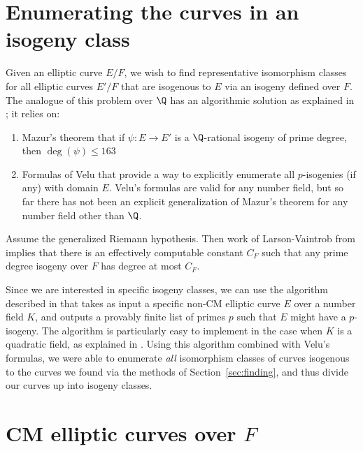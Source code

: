 \documentclass{amsart}
\begin{document}
\section{Enumerating the curves in an isogeny class}\label{sec:isoclass}

Given an elliptic curve $E/F$, we wish to find representative
isomorphism classes for all elliptic curves $E'/F$ that are isogenous
to $E$ via an isogeny defined over $F$. The analogue of this problem
over $\Q$ has an algorithmic solution as explained in
\cite[\S3.8]{cremona:algs}; it relies on:
\begin{enumerate}
\item  Mazur's theorem \cite{mazur:rational} 
that if $\psi:E\to E'$ is a $\Q$-rational isogeny of prime degree, 
then $\deg(\psi)\leq 163$
\item Formulas of Velu \cite{velu:isogenies} 
that provide a way to explicitly enumerate all $p$-isogenies (if any) with domain $E$.  
Velu's formulas are valid for any number field, but so far there has not been an explicit
generalization of Mazur's theorem for any number field other than $\Q$. 
\end{enumerate}

\begin{remark}
  Assume the generalized Riemann hypothesis.  Then work of Larson-Vaintrob 
  from \cite{larson-vaintrob} implies that there is an effectively computable constant $C_F$ 
  such that any prime degree isogeny over $F$ has degree at most $C_F$.
\end{remark}

Since we are interested in specific isogeny classes, 
we can use the algorithm described in \cite{billerey:isog} that takes as
input a specific non-CM elliptic curve $E$ over a number field $K$, and
outputs a provably finite list of primes $p$ such that $E$ might have a
$p$-isogeny. The algorithm is particularly easy to implement in the
case when $K$ is a quadratic field, as explained in
\cite[\S2.3.4]{billerey:isog}.  Using this algorithm combined with
Velu's formulas, we were able to enumerate {\em all}
isomorphism classes of curves isogenous to the curves we found via the
methods of Section~\ref{sec:finding}, and thus divide our curves up into
isogeny classes.


\section{CM elliptic curves over $F$}\label{sec:cm}
\end{document}
